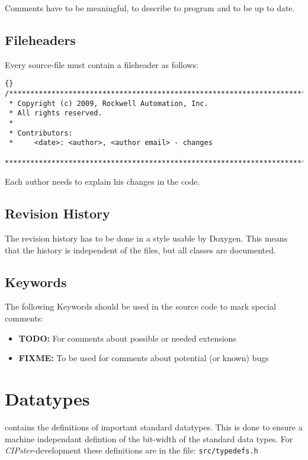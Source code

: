 \documentclass[final,a4paper,10pt, oneside]{article}
\begin{document}
Comments have to be meaningful, to describe to program and to be up to date.


\subsection{Fileheaders}
Every source-file must contain a fileheader as follows:
\begin{lstlisting}[frame=trbl]{}
/*******************************************************************************
 * Copyright (c) 2009, Rockwell Automation, Inc.
 * All rights reserved.
 *
 * Contributors:
 *     <date>: <author>, <author email> - changes
 ******************************************************************************/
\end{lstlisting}
Each author needs to explain his changes in the code.
\subsection{Revision History}
The revision history has to be done in a style  usable by Doxygen. This means that the history is independent of the files, but all classes are documented.

\subsection{Keywords}
The following Keywords should be used in the source code to mark special comments:
\begin{itemize}
    \item \textbf{TODO:} For comments about possible or needed extensions
    \item \textbf{FIXME:} To be used for comments about potential (or known) bugs
\end{itemize}

\section{Datatypes}
 contains the definitions of important standard datatypes. This is done to ensure a machine independant defintion of the bit-width of the standard data types. For \emph{CIPster}-development these definitions are in the file: \verb|src/typedefs.h|
\end{document}
